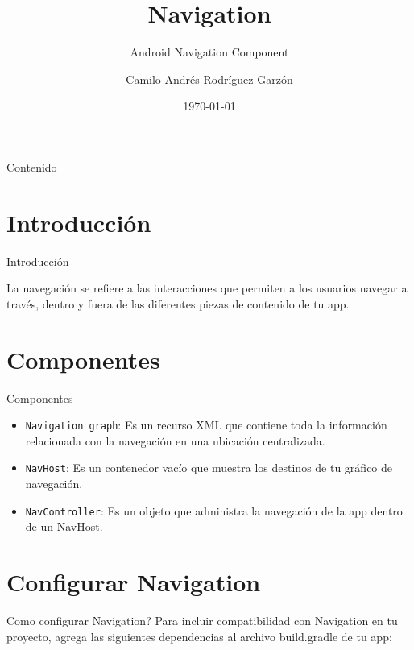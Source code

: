 \documentclass[10pt,xcolor={table,dvipsnames},t]{beamer}
\title[Android Navigation Component]{Navigation}
\subtitle{Android Navigation Component}
\author{Camilo Andrés Rodríguez Garzón}
\institute{Android/Shopper}
\date{\today}
\begin{document}
\begin{frame}
  \titlepage
\end{frame}

\begin{frame}{Contenido}
  \tableofcontents
\end{frame}

\section{Introducción}

\begin{frame}{Introducción}

\justifying
La navegación se refiere a las interacciones que permiten a los usuarios navegar a través, dentro y fuera de las diferentes piezas de contenido de tu app.

\end{frame}

\section{Componentes}

\begin{frame}{Componentes}

\justifying

\begin{itemize}
  \item \texttt{Navigation graph}: Es un recurso XML que contiene toda la información relacionada con la navegación en una ubicación centralizada.
  \item \texttt{NavHost}: Es un contenedor vacío que muestra los destinos de tu gráfico de navegación.
  \item \texttt{NavController}: Es un objeto que administra la navegación de la app dentro de un NavHost.
\end{itemize}

\end{frame}

\section{Configurar Navigation}

\begin{frame}{Como configurar Navigation?}
Para incluir compatibilidad con Navigation en tu proyecto, agrega las siguientes dependencias al archivo build.gradle de tu app:


\end{frame}
\end{document}
